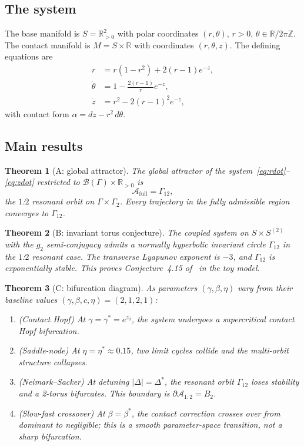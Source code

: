 \documentclass[12pt, oneside]{book}
\theoremstyle{plain}
\newtheorem{theorem}{Theorem}[section]
\theoremstyle{definition}
\theoremstyle{remark}
\newcommand{\R}{\mathbb{R}}
\newcommand{\Orb}{\Gamma}
\newcommand{\cB}{\mathcal{B}}
\newcommand{\abs}[1]{\left|#1\right|}
\begin{document}
\subsection{The system}

The base manifold is $S=\R^2_{>0}$ with polar coordinates $(r,\theta)$,
$r>0$, $\theta\in\R/2\pi\mathbb{Z}$. The contact manifold is
$M=S\times\R$ with coordinates $(r,\theta,z)$. The defining equations are
\begin{align}
  \dot r &= r(1-r^2) + 2(r-1)e^{-z},\label{eq:rdot}\\
  \dot\theta &= 1 - \frac{2(r-1)}{r}e^{-z},\label{eq:thetadot}\\
  \dot z &= r^2 - 2(r-1)^2 e^{-z},\label{eq:zdot}
\end{align}
with contact form $\alpha=dz-r^2\,d\theta$.

\subsection{Main results}

\begin{theorem}[A: global attractor]\label{thm:A}
The global attractor of the system~\eqref{eq:rdot}--\eqref{eq:zdot}
restricted to $\cB(\Orb)\times\R_{>0}$ is
\[
  \mathcal{A}_{\mathrm{full}} = \Orb_{12},
\]
the $1$:$2$ resonant orbit on $\Orb\times\Orb_2$. Every trajectory
in the fully admissible region converges to $\Orb_{12}$.
\end{theorem}

\begin{theorem}[B: invariant torus conjecture]\label{thm:B}
The coupled system on $S\times S^{(2)}$ with the $g_2$ semi-conjugacy
admits a normally hyperbolic invariant circle $\Orb_{12}$ in the
$1$:$2$ resonant case. The transverse Lyapunov exponent is $-3$,
and $\Orb_{12}$ is exponentially stable. This proves
Conjecture~4.15 of~\cite{Paper1} in the toy model.
\end{theorem}

\begin{theorem}[C: bifurcation diagram]\label{thm:C}
As parameters $(\gamma,\beta,\eta)$ vary from their baseline values
$(\gamma,\beta,c,\eta)=(2,1,2,1)$:
\begin{enumerate}[label=\textup{(\roman*)}]
  \item \textup{(Contact Hopf)} At $\gamma=\gamma^*=e^{z_0}$, the
        system undergoes a supercritical contact Hopf bifurcation.
  \item \textup{(Saddle-node)} At $\eta=\eta^*\approx 0.15$, two
        limit cycles collide and the multi-orbit structure collapses.
  \item \textup{(Neimark--Sacker)} At detuning $\abs{\Delta}=\Delta^*$,
        the resonant orbit $\Orb_{12}$ loses stability and a 2-torus
        bifurcates. This boundary is $\partial\mathcal{A}_{1:2}=B_2$.
  \item \textup{(Slow-fast crossover)} At $\beta=\beta^*$, the
        contact correction crosses over from dominant to negligible;
        this is a smooth parameter-space transition, not a sharp
        bifurcation.
\end{enumerate}
\end{theorem}
\end{document}
